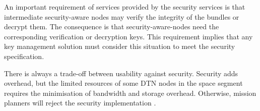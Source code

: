 An important requirement of services provided by the security services is that intermediate security-aware nodes may verify the integrity of the bundles or decrypt them. The consequence is that security-aware-nodes need the corresponding verification or decryption keys. This requirement implies that any key management solution must consider this situation to meet the security specification. 

There is always a trade-off between usability against security. Security adds overhead, but the limited resources of some DTN nodes in the space segment requires the minimisation of bandwidth and storage overhead. Otherwise, mission planners will reject the security implementation \cite{book2012architecture}.














